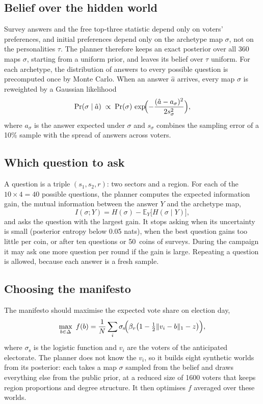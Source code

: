 \documentclass[11pt,a4paper,oneside]{report}
\newcommand{\coins}[1]{#1~coins}
\newcommand{\simplex}{\Delta}
\newcommand{\E}{\mathbb{E}}
\begin{document}
\subsection{Belief over the hidden world}

Survey answers and the free top-three statistic depend only on voters' preferences, and initial
preferences depend only on the archetype map $\sigma$, not on the personalities $\tau$. The planner
therefore keeps an exact posterior over all 360 maps $\sigma$, starting from a uniform prior, and leaves
its belief over $\tau$ uniform. For each archetype, the distribution of answers to every possible question
is precomputed once by Monte Carlo. When an answer $\hat a$ arrives, every map $\sigma$ is reweighted by a
Gaussian likelihood
\begin{equation}
  \Pr(\sigma \mid \hat a) \;\propto\; \Pr(\sigma)\, \exp\!\Bigl(-\frac{(\hat a - a_\sigma)^2}{2 s^2_\sigma}\Bigr),
\end{equation}
where $a_\sigma$ is the answer expected under $\sigma$ and $s_\sigma$ combines the sampling error of a 10\%
sample with the spread of answers across voters.

\subsection{Which question to ask}

A question is a triple $(s_1, s_2, r)$: two sectors and a region. For each of the $10 \times 4 = 40$
possible questions, the planner computes the expected information gain, the mutual information between the
answer $Y$ and the archetype map,
\begin{equation}
  I(\sigma; Y) = H(\sigma) - \E_{Y}\bigl[ H(\sigma \mid Y) \bigr],
\end{equation}
and asks the question with the largest gain. It stops asking when its uncertainty is small (posterior
entropy below 0.05 nats), when the best question gains too little per coin, or after ten questions or
\coins{50} of surveys. During the campaign it may ask one more question per round if the gain is large.
Repeating a question is allowed, because each answer is a fresh sample.

\subsection{Choosing the manifesto}\label{sec:manifesto-opt}

The manifesto should maximise the expected vote share on election day,
\begin{equation}\label{eq:manifesto}
  \max_{b \in \simplex}\ f(b) = \frac{1}{N}\sum_{i} \sigma_{\mathrm{s}}\!\Bigl(\beta_v\bigl(1 - \tfrac12\lVert v_i - b\rVert_1 - z\bigr)\Bigr),
\end{equation}
where $\sigma_{\mathrm s}$ is the logistic function and $v_i$ are the voters of the anticipated electorate.
The planner does not know the $v_i$, so it builds eight synthetic worlds from its posterior: each takes a
map $\sigma$ sampled from the belief and draws everything else from the public prior, at a reduced size of
1600 voters that keeps region proportions and degree structure. It then optimises $f$ averaged over these
worlds.
\end{document}
